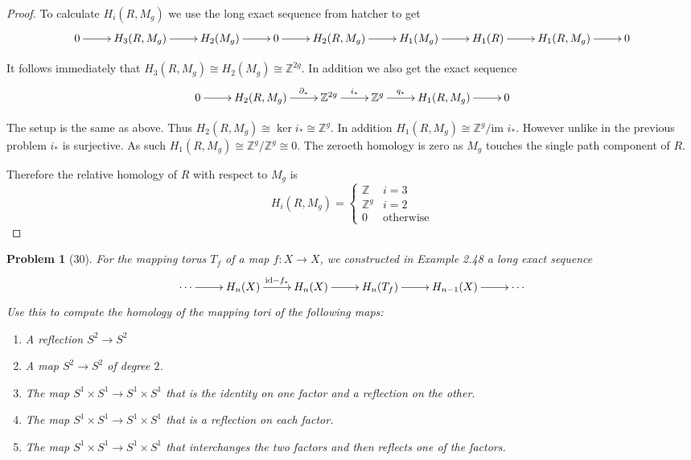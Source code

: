 \documentclass[10pt]{article}
\newcommand{\sk}{\vskip 10mm}
\newcommand{\bb}[1]{\mathbb{#1}}
\newcommand{\id}{\mathrm{id}}
\theoremstyle{plain}
\newtheorem{problem}{Problem}
\theoremstyle{remark}
\begin{document}
\begin{proof}
  \sk

  To calculate $H_i(R,M_g)$ we use the long exact sequence from hatcher to get
  \[
    \xymatrix{
      0 \ar[r] & H_3(R,M_g) \ar[r] & H_2(M_g) \ar[r] & 0 \ar[r] & H_2(R,M_g) \ar[r] & H_1(M_g) \ar[r] & H_1(R) \ar[r] & H_1(R,M_g) \ar[r] & 0
    }
  \]

  It follows immediately that $H_3(R,M_g)\cong H_2(M_g)\cong \bb{Z}^{2g}$. In addition we also get
  the exact sequence
  \[
    \xymatrix{
      0 \ar[r] & H_2(R,M_g) \ar[r]^-{\partial_*} & \bb{Z}^{2g} \ar[r]^-{i_*} & \bb{Z}^g \ar[r]^-{q_*} & H_1(R,M_g) \ar[r] & 0
    }
  \]

  The setup is the same as above. Thus $H_2(R,M_g)\cong \ker i_*\cong\bb{Z}^g$. In addition
  $H_1(R,M_g)\cong \bb{Z}^g/\text{im\ }i_*$. However unlike in the previous problem $i_*$
  is surjective. As such $H_1(R,M_g)\cong \bb{Z}^g/\bb{Z}^g\cong 0$. The zeroeth homology is
  zero as $M_g$ touches the single path component of $R$.

  Therefore the relative homology of $R$ with respect to $M_g$ is
  \[
    H_i(R,M_g) = 
    \left\{
      \begin{array}{cr}
        \bb{Z} & i=3\\
        \bb{Z}^g & i=2\\
        0 & \text{otherwise}
      \end{array}
    \right.
  \]
\end{proof}

\sk

\begin{problem}[30]
  For the mapping torus $T_f$ of a map $f: X\rightarrow X$,
  we constructed in Example 2.48 a long exact sequence
  \[
    \xymatrix{
      \cdots \ar[r] & H_n(X) \ar[r]^{\id-f_*} & H_n(X) \ar[r] & H_n(T_f) \ar[r] & H_{n-1}(X) \ar[r] & \cdots
    }
  \]
  Use this to compute the homology of the mapping tori of the following maps:
  \begin{enumerate}
  \item[(a)] A reflection $S^2\rightarrow S^2$
  \item[(b)] A map $S^2\rightarrow S^2$ of degree $2$.
  \item[(c)] The map $S^1\times S^1\rightarrow S^1\times S^1$ that is the
    identity on one factor and a reflection on the other.
  \item[(d)] The map $S^1\times S^1\rightarrow S^1\times S^1$ that is a
    reflection on each factor.
  \item[(e)] The map $S^1\times S^1\rightarrow S^1\times S^1$ that interchanges
    the two factors and then reflects one of the factors.
  \end{enumerate}
\end{problem}
\end{document}
